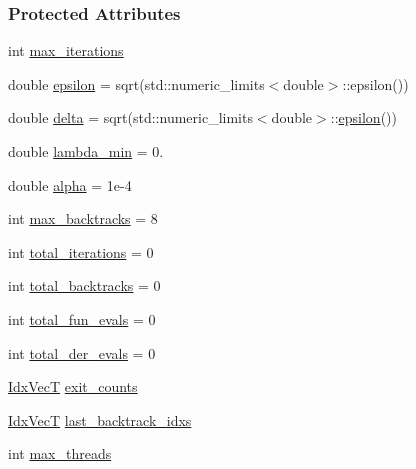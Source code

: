 \subsubsection*{Protected Attributes}
\begin{DoxyCompactItemize}
\item 
int \hyperlink{classmappel_1_1IterativeMaximizer_ac888935f332b069836a559f44cd267c7}{max\+\_\+iterations}
\item 
double \hyperlink{classmappel_1_1IterativeMaximizer_ae727ea0e3cab3924d21ebe9c12fec314}{epsilon} = sqrt(std\+::numeric\+\_\+limits$<$double$>$\+::epsilon())
\item 
double \hyperlink{classmappel_1_1IterativeMaximizer_a0aab5231009711a55325adbeb7d5f282}{delta} = sqrt(std\+::numeric\+\_\+limits$<$double$>$\+::\hyperlink{classmappel_1_1IterativeMaximizer_ae727ea0e3cab3924d21ebe9c12fec314}{epsilon}())
\item 
double \hyperlink{classmappel_1_1IterativeMaximizer_a871576ad8b418a1f05df6a9eba2c60ab}{lambda\+\_\+min} = 0.
\item 
double \hyperlink{classmappel_1_1IterativeMaximizer_ae8a6d8e5c263fa60aaf39fbf96cd6c48}{alpha} = 1e-\/4
\item 
int \hyperlink{classmappel_1_1IterativeMaximizer_a72148f311140be63ded9794921a7c112}{max\+\_\+backtracks} = 8
\item 
int \hyperlink{classmappel_1_1IterativeMaximizer_a8d344b09841e61cc726dc430d8451044}{total\+\_\+iterations} = 0
\item 
int \hyperlink{classmappel_1_1IterativeMaximizer_a752717a4e69ba7cd44a6167d0cbdb242}{total\+\_\+backtracks} = 0
\item 
int \hyperlink{classmappel_1_1IterativeMaximizer_afbb76db27b845efa8e958611dd3c8d3c}{total\+\_\+fun\+\_\+evals} = 0
\item 
int \hyperlink{classmappel_1_1IterativeMaximizer_a76de3653a5f2c200ad6865372eb9c154}{total\+\_\+der\+\_\+evals} = 0
\item 
\hyperlink{namespacemappel_ac63743dcd42180127307cd0e4ecdd784}{Idx\+VecT} \hyperlink{classmappel_1_1IterativeMaximizer_a8a3554d07f510ab9e68d884307f937cc}{exit\+\_\+counts}
\item 
\hyperlink{namespacemappel_ac63743dcd42180127307cd0e4ecdd784}{Idx\+VecT} \hyperlink{classmappel_1_1IterativeMaximizer_a80280950668483fccde55616ecc38b7b}{last\+\_\+backtrack\+\_\+idxs}
\item 
int \hyperlink{classmappel_1_1ThreadedEstimator_a31391f8aaab3484f58bfdedbdb22be42}{max\+\_\+threads}

\end{DoxyCompactItemize}
